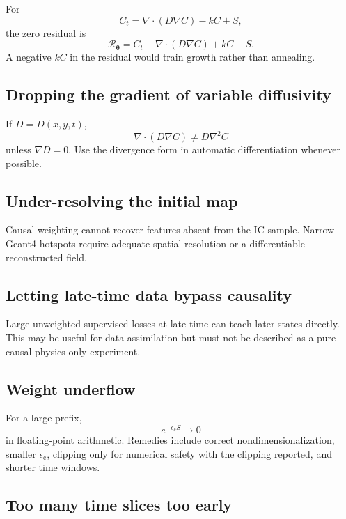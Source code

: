\documentclass[11pt]{article}
\newcommand{\thetav}{\bm{\theta}}
\newcommand{\Rnet}{\mathcal{R}_{\thetav}}
\newcommand{\epsc}{\epsilon_{\mathrm{c}}}
\begin{document}
For
\begin{equation}
C_t=\nabla\cdot(D\nabla C)-kC+S,
\end{equation}
the zero residual is
\begin{equation}
\Rnet=C_t-\nabla\cdot(D\nabla C)+kC-S.
\end{equation}
A negative $kC$ in the residual would train growth rather than annealing.

\subsection{Dropping the gradient of variable diffusivity}

If $D=D(x,y,t)$,
\begin{equation}
\nabla\cdot(D\nabla C)
\ne
D\nabla^2C
\end{equation}
unless $\nabla D=0$. Use the divergence form in automatic differentiation whenever possible.

\subsection{Under-resolving the initial map}

Causal weighting cannot recover features absent from the IC sample. Narrow Geant4 hotspots require adequate spatial resolution or a differentiable reconstructed field.

\subsection{Letting late-time data bypass causality}

Large unweighted supervised losses at late time can teach later states directly. This may be useful for data assimilation but must not be described as a pure causal physics-only experiment.

\subsection{Weight underflow}

For a large prefix,
\begin{equation}
e^{-\epsc S}\rightarrow0
\end{equation}
in floating-point arithmetic. Remedies include correct nondimensionalization, smaller $\epsc$, clipping only for numerical safety with the clipping reported, and shorter time windows.

\subsection{Too many time slices too early}
\end{document}
